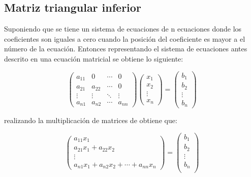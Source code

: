 \subsection{Matriz triangular inferior}

Suponiendo que se tiene un sistema de ecuaciones de n ecuaciones donde los coeficientes son iguales a cero cuando la posición del coeficiente es mayor a el número de la ecuación. Entonces representando el sistema de ecuaciones antes descrito en una ecuación matricial se obtiene lo siguiente:

\begin{equation*}
    \begin{pmatrix}
        a_{11} & 0      & \cdots & 0      \\
        a_{21} & a_{22} & \cdots & 0      \\
        \vdots & \vdots & \ddots & \vdots \\
        a_{n1} & a_{n2} & \cdots & a_{nn}
    \end{pmatrix}
    \begin{pmatrix}
        x_1    \\
        x_2    \\
        \vdots \\
        x_n
    \end{pmatrix} =
    \begin{pmatrix}
        b_1    \\
        b_2    \\
        \vdots \\
        b_n
    \end{pmatrix}
\end{equation*}

realizando la multiplicación de matrices de obtiene que:

\begin{equation*}
    \begin{pmatrix}
        a_{11}x_{1}             \\
        a_{21}x_{1}+a_{22}x_{2} \\
        \vdots                  \\
        a_{n1}x_1+a_{n2}x_2+\cdots+a_{nn}x_{n}
    \end{pmatrix} =
    \begin{pmatrix}
        b_1    \\
        b_2    \\
        \vdots \\
        b_n    \\
    \end{pmatrix}
\end{equation*}

